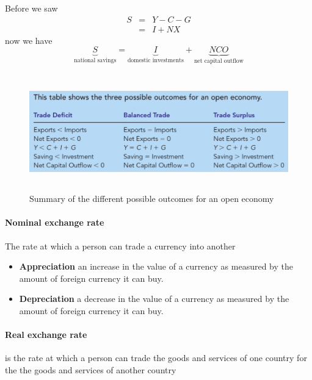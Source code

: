 \documentclass[a4paper,titlepage] {scrartcl}
\begin{document}
Before we saw
\begin{eqnarray*}
	S &=& Y - C -G\\
	 &=& I + NX
\end{eqnarray*}
now we have
\begin{equation}
	\underbrace{S}_{\text{national savings}} = \underbrace{I}_{\text{domestic investments}} + \underbrace{NCO}_{\text{net capital outflow}}
\end{equation}
\begin{figure}[htbp]
	\centering
		\includegraphics[height=2in]{images/tradeopeneco.png}
	\caption{Summary of the different possible outcomes for an open economy}
	\label{fig:images_tradeopeneco}
\end{figure}



\paragraph{Nominal exchange rate} %
\label{par:nominal_exchange_rate}
The rate at which a person can trade a currency into another

\begin{itemize}
	\item \textbf{Appreciation} an increase in the value of a currency as measured by the amount of foreign currency it can buy.
	\item \textbf{Depreciation } a decrease in the value of a currency as measured by the amount of foreign currency it can buy.
\end{itemize}

\paragraph{Real exchange rate} %
\label{par:real_exchange_rate}
is the rate at which a person can trade the goods and services of one country for the  the goods and services of another country
\end{document}
